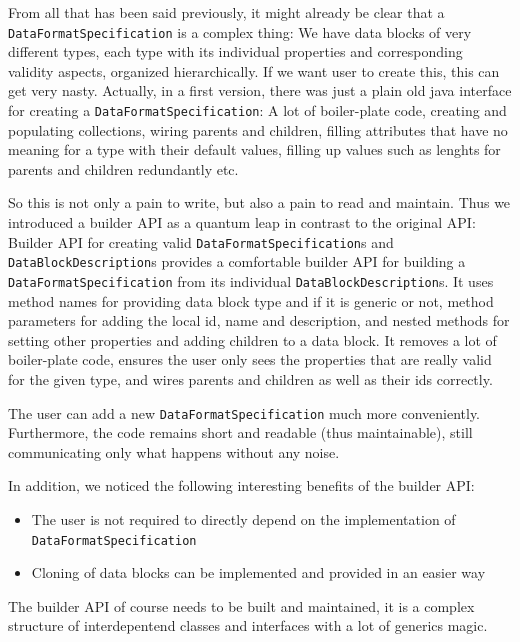 From all that has been said previously, it might already be clear that a \texttt{DataFormatSpecification} is a complex thing: We have data blocks of very different types, each type with its individual properties and corresponding validity aspects, organized hierarchically. If we want user to create this, this can get very nasty. Actually, in a first version, there was just a plain old java interface for creating a \texttt{DataFormatSpecification}: A lot of boiler-plate code, creating and populating collections, wiring parents and children, filling attributes that have no meaning for a type with their default values, filling up values such as lenghts for parents and children redundantly etc.

So this is not only a pain to write, but also a pain to read and maintain. Thus we introduced a builder API as a quantum leap in contrast to the original API:
{%
Builder API for creating valid \texttt{DataFormatSpecification}s and \texttt{DataBlockDescription}s
}
{%
\COMPdataFormatManagement{} provides a comfortable builder API for building a \texttt{DataFormatSpecification} from its individual \texttt{DataBlockDescription}s. It uses method names for providing data block type and if it is generic or not, method parameters for adding the local id, name and description, and nested methods for setting other properties and adding children to a data block. It removes a lot of boiler-plate code, ensures the user only sees the properties that are really valid for the given type, and wires parents and children as well as their ids correctly.
}
{%
The user can add a new \texttt{DataFormatSpecification} much more conveniently. Furthermore, the code remains short and readable (thus maintainable), still communicating only what happens without any noise.

In addition, we noticed the following interesting benefits of the builder API:
\begin{itemize}
\item The user is not required to directly depend on the implementation of \texttt{DataFormatSpecification}
\item Cloning of data blocks can be implemented and provided in an easier way
\end{itemize}
}
{%
The builder API of course needs to be built and maintained, it is a complex structure of interdepentend classes and interfaces with a lot of generics magic. 
}


%
%
